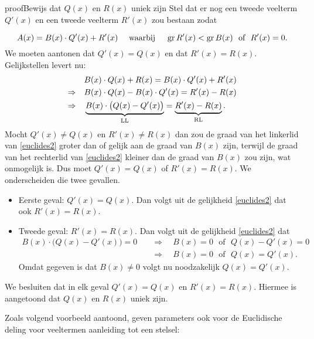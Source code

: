 \documentclass{ximera}
\begin{document}
\begin{expandable}{proof}{Bewijs dat $Q(x)$ en $R(x)$ uniek zijn} 
Stel dat er nog een tweede veelterm $Q'(x)$ en een tweede veelterm $R'(x)$ zou bestaan zodat

\[
A(x) = B(x)\cdot Q'(x) + R'(x) \quad \text{ waarbij } \quad \operatorname{gr} R'(x) < \operatorname{gr} B(x) \,\, \text{ of } \,\, R'(x) = 0.
\]
We moeten aantonen dat $Q'(x) = Q(x)$ en dat $R'(x) = R(x)$. Gelijkstellen levert nu:
\begin{align}
& B(x) \cdot Q(x) + R(x) = B(x) \cdot Q'(x) + R'(x) \notag \\
\Rightarrow \quad & B(x) \cdot Q(x) - B(x) \cdot Q'(x) = R'(x) - R(x) \notag \\
\Rightarrow \quad & \underbrace{B(x) \cdot \bigl(Q(x) - Q'(x)\bigr)}_{\text{LL}} = \underbrace{R'(x) - R(x)}_{\text{RL}}. \label{euclides2}
\end{align}
Mocht $Q'(x) \neq Q(x)$ en $R'(x) \neq R(x)$ dan zou de graad van het linkerlid van \eqref{euclides2} groter dan of gelijk aan de graad van $B(x)$ zijn, terwijl de graad van het rechterlid van \eqref{euclides2} kleiner dan de graad van $B(x)$ zou zijn, wat onmogelijk is. Dus moet $Q'(x) = Q(x)$ of $R'(x) = R(x)$. We onderscheiden die twee gevallen.
\begin{itemize}
\item[]
Eerste geval: $Q'(x) = Q(x)$. Dan volgt uit de gelijkheid \eqref{euclides2} dat ook $R'(x) = R(x)$.  
\item[]
Tweede geval: $R'(x) = R(x)$. Dan volgt uit de gelijkheid \eqref{euclides2} dat
\begin{align*}
B(x) \cdot \bigl(Q(x) - Q'(x)\bigr) = 0 \quad 
& \Rightarrow \quad B(x) = 0 \,\, \text{ of } \,\, Q(x) - Q'(x) = 0 \\
& \Rightarrow \quad B(x) = 0 \,\, \text{ of } \,\, Q(x) = Q'(x). 
\end{align*}
Omdat gegeven is dat $B(x) \neq 0$ volgt nu noodzakelijk $Q(x) = Q'(x)$.
\end{itemize}
We besluiten dat in elk geval $Q'(x) = Q(x)$ en $R'(x) = R(x)$. Hiermee is aangetoond dat $Q(x)$ en $R(x)$ uniek zijn. 

\end{expandable}


Zoals volgend voorbeeld aantoond, geven parameters ook voor de Euclidische deling voor veeltermen aanleiding tot een stelsel: 
\end{document}
